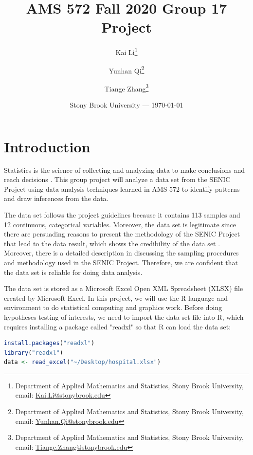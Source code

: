 \documentclass[11pt]{article}
\title{AMS 572 Fall 2020 Group 17 Project}
\author{
  Kai Li\thanks{Department of Applied Mathematics and Statistics, Stony Brook University, email: \href{mailto:Kai.Li@stonybrook.edu}{Kai.Li@stonybrook.edu}}\and
  Yunhan Qi\thanks{Department of Applied Mathematics and Statistics, Stony Brook University, email: \href{mailto:Yunhan.Qi@stonybrook.edu}{Yunhan.Qi@stonybrook.edu}}\and
  Tiange Zhang\thanks{Department of Applied Mathematics and Statistics, Stony Brook University, email: \href{mailto:Tiange.Zhang@stonybrook.edu}{Tiange.Zhang@stonybrook.edu}}
}
\date{Stony Brook University --- \today}
\begin{document}
\maketitle

\section{Introduction}
Statistics is the science of collecting and analyzing data to make conclusions and reach decisions \cite{bk:tamhane_dunlop}. This group project will analyze a data set from the SENIC Project \cite{ar:senic} using data analysis techniques learned in AMS 572 to identify patterns and draw inferences from the data. 

The data set follows the project guidelines because it contains 113 samples and 12 continuous, categorical variables. Moreover, the data set is legitimate since there are persuading reasons to present the methodology of the SENIC Project that lead to the data result, which shows the credibility of the data set \cite{ar:eickhoff}. Moreover, there is a detailed description in \cite{ar:eickhoff} discussing the sampling procedures and methodology used in the SENIC Project. Therefore, we are confident that the data set is reliable for doing data analysis.

The data set is stored as a Microsoft Excel Open XML Spreadsheet (XLSX) file created by Microsoft Excel. In this project, we will use the R language and environment to do statistical computing and graphics work. Before doing hypotheses testing of interests, we need to import the data set file into R, which requires installing a package called "readxl" so that R can load the data set:
\begin{file}[hospital.r]
\begin{lstlisting}[language = R]
install.packages("readxl")
library("readxl")
data <- read_excel("~/Desktop/hospital.xlsx")
\end{lstlisting}
\end{file}
\end{document}
